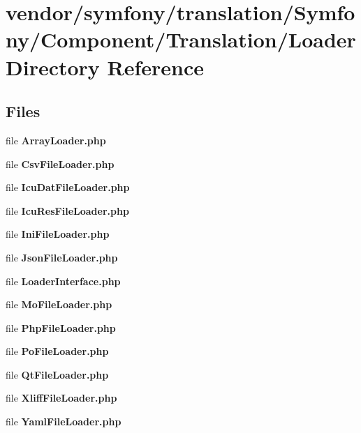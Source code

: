 \section{vendor/symfony/translation/\+Symfony/\+Component/\+Translation/\+Loader Directory Reference}
\label{dir_3ee2a2834f9c30636314e3c27579bc57}
\subsection*{Files}
\begin{DoxyCompactItemize}
\item 
file {\bf Array\+Loader.\+php}
\item 
file {\bf Csv\+File\+Loader.\+php}
\item 
file {\bf Icu\+Dat\+File\+Loader.\+php}
\item 
file {\bf Icu\+Res\+File\+Loader.\+php}
\item 
file {\bf Ini\+File\+Loader.\+php}
\item 
file {\bf Json\+File\+Loader.\+php}
\item 
file {\bf Loader\+Interface.\+php}
\item 
file {\bf Mo\+File\+Loader.\+php}
\item 
file {\bf Php\+File\+Loader.\+php}
\item 
file {\bf Po\+File\+Loader.\+php}
\item 
file {\bf Qt\+File\+Loader.\+php}
\item 
file {\bf Xliff\+File\+Loader.\+php}
\item 
file {\bf Yaml\+File\+Loader.\+php}
\end{DoxyCompactItemize}
